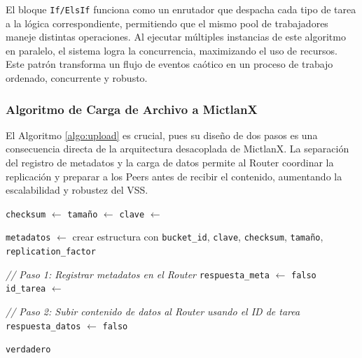 El bloque \texttt{If/ElsIf} funciona como un enrutador que despacha cada tipo de tarea a la lógica correspondiente, permitiendo que el mismo pool de trabajadores maneje distintas operaciones. Al ejecutar múltiples instancias de este algoritmo en paralelo, el sistema logra la concurrencia, maximizando el uso de recursos. Este patrón transforma un flujo de eventos caótico en un proceso de trabajo ordenado, concurrente y robusto.

\subsubsection{Algoritmo de Carga de Archivo a MictlanX}
El Algoritmo \ref{algo:upload} es crucial, pues su diseño de dos pasos es una consecuencia directa de la arquitectura desacoplada de MictlanX. La separación del registro de metadatos y la carga de datos permite al Router coordinar la replicación y preparar a los Peers antes de recibir el contenido, aumentando la escalabilidad y robustez del VSS.

\begin{algorithm}
\caption{Carga de Archivo a MictlanX}
\label{algo:upload}
\begin{algorithmic}[1]
    \State \texttt{checksum} $\leftarrow$ 
    \State \texttt{tamaño} $\leftarrow$ 
    \State \texttt{clave} $\leftarrow$ 
    
    \State \texttt{metadatos} $\leftarrow$ crear estructura con \texttt{bucket\_id}, \texttt{clave}, \texttt{checksum}, \texttt{tamaño}, \texttt{replication\_factor}
    
    \State \textit{// Paso 1: Registrar metadatos en el Router}
    \State \texttt{respuesta\_meta} $\leftarrow$ 
        \State \Return \texttt{falso}
    \EndIf
    \State \texttt{id\_tarea} $\leftarrow$ 
    
    \State \textit{// Paso 2: Subir contenido de datos al Router usando el ID de tarea}
    \State \texttt{respuesta\_datos} $\leftarrow$ 
        \State \Return \texttt{falso}
    \EndIf
    
    \State \Return \texttt{verdadero}
\EndProcedure
\end{algorithmic}
\end{algorithm}

